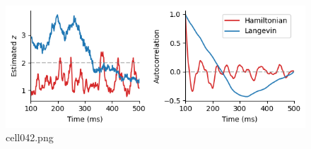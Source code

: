 \begin{figure}[ht]
	\centering
	\includegraphics[scale=0.8, max width=\linewidth]{./fig/bayesian-brain/neural-sampling/cell042.png}
	\caption{cell042.png}
	\label{cell042.png}
\end{figure}